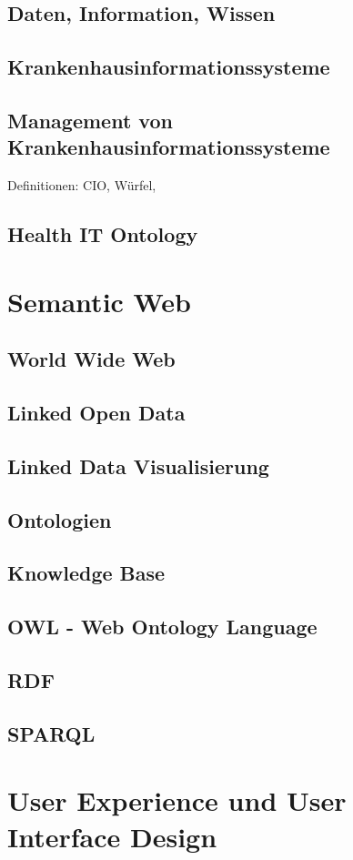 \subsection{Daten, Information, Wissen}
\subsection{Krankenhausinformationssysteme}
\subsection{Management von Krankenhausinformationssysteme}
Definitionen: CIO, Würfel, 
\subsection{Health IT Ontology} 

\section{Semantic Web}\label{sec:sw}
\subsection{World Wide Web}
\subsection{Linked Open Data}
\subsection{Linked Data Visualisierung}  
\subsection{Ontologien}
\subsection{Knowledge Base}
\subsection{OWL - Web Ontology Language}
\subsection{RDF} 
\subsection{SPARQL} 

\section{User Experience und User Interface Design}\label{sec:ux}
